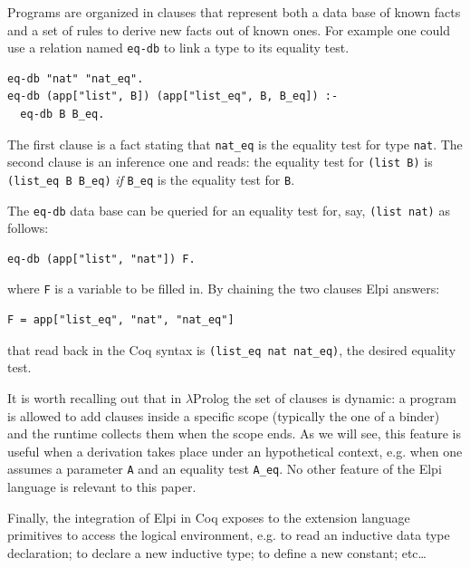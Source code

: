\documentclass[sigplan,10pt,review]{acmart}\settopmatter{printfolios=true,printccs=false,printacmref=false}
\begin{document}
Programs are
organized in clauses that represent both a data base of known facts
and a set of rules to derive new facts out of known ones.
For example one could use a relation named \lstinline+eq-db+
to link a type to its equality test.

\begin{minipage}{\textwidth}\begin{lstlisting}
eq-db "nat" "nat_eq".
eq-db (app["list", B]) (app["list_eq", B, B_eq]) :-
  eq-db B B_eq.
\end{lstlisting}\end{minipage}

The first clause is a fact stating that
\lstinline+nat_eq+ is the equality test for type
\lstinline+nat+.
The second clause is an inference one and reads: the equality test
for \lstinline+(list B)+ is \lstinline+(list_eq B B_eq)+ \emph{if}
\lstinline+B_eq+ is the equality test for \lstinline+B+.

The \lstinline+eq-db+ data base can be queried for
an equality test for, say, \lstinline+(list nat)+ as follows:

\begin{minipage}{\textwidth}\begin{lstlisting}
eq-db (app["list", "nat"]) F.
\end{lstlisting}\end{minipage}

\noindent
where \lstinline+F+ is a variable to be filled in.
By chaining the two clauses Elpi answers:

\begin{minipage}{\textwidth}\begin{lstlisting}
F = app["list_eq", "nat", "nat_eq"]
\end{lstlisting}\end{minipage}

\noindent
that read back in the Coq syntax is
\lstinline+(list_eq nat nat_eq)+, the desired
equality test.

It is worth recalling out that in $\lambda$Prolog the set of clauses
is dynamic: a program is allowed to add clauses inside
a specific scope (typically the one of a binder) and the runtime
collects them when the scope ends. As we will see, this feature
is useful when a derivation takes place under an hypothetical
context, e.g. when one assumes a parameter \lstinline+A+ and
an equality test \lstinline+A_eq+.
No other feature of the Elpi language is relevant to this paper.

Finally, the integration of Elpi in Coq exposes to the extension
language primitives to access the logical environment, e.g.
to read an inductive data type declaration; to declare a
new inductive type; to define a new constant; etc\ldots
\end{document}
